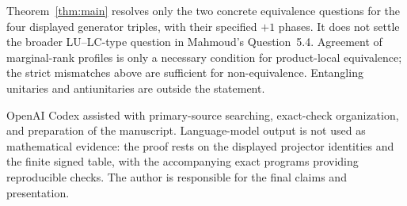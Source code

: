 \documentclass[11pt]{article}
\begin{document}
Theorem~\ref{thm:main} resolves only the two concrete equivalence questions
for the four displayed generator triples, with their specified $+1$
phases.  It does not settle the broader LU--LC-type question in
Mahmoud's Question~5.4.  Agreement of marginal-rank profiles is only a
necessary condition for product-local equivalence; the strict mismatches
above are sufficient for non-equivalence.  Entangling unitaries and
antiunitaries are outside the statement.

OpenAI Codex assisted with primary-source searching, exact-check
organization, and preparation of the manuscript.  Language-model output is
not used as mathematical evidence: the proof rests on the displayed
projector identities and the finite signed table, with the accompanying
exact programs providing reproducible checks.  The author is responsible
for the final claims and presentation.



\end{document}
